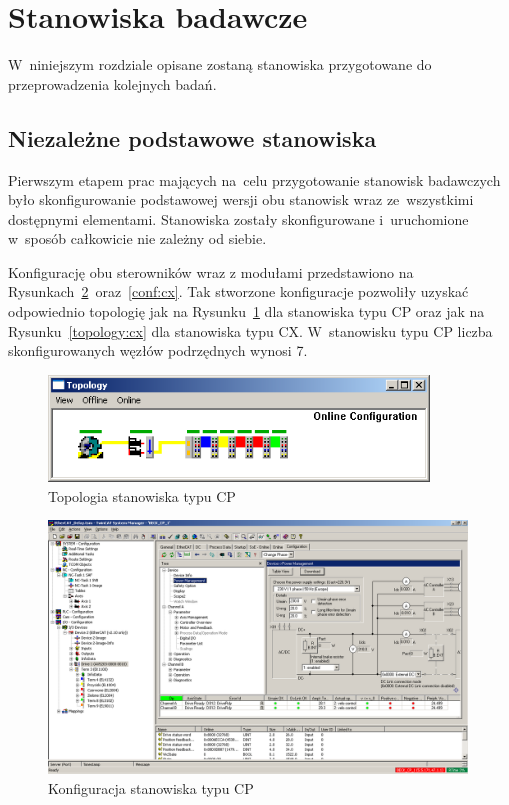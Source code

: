 \section{Stanowiska badawcze}
W~niniejszym rozdziale opisane zostaną stanowiska przygotowane do przeprowadzenia kolejnych badań.

\subsection{Niezależne podstawowe stanowiska}
Pierwszym etapem prac mających na~celu przygotowanie stanowisk badawczych było skonfigurowanie podstawowej wersji obu stanowisk wraz ze~wszystkimi dostępnymi elementami. Stanowiska zostały skonfigurowane i~uruchomione w~sposób całkowicie nie zależny od siebie.

Konfigurację obu sterowników wraz z modułami przedstawiono na Rysunkach~\ref{conf:cp}~oraz~\ref{conf:cx}. Tak stworzone konfiguracje pozwoliły uzyskać odpowiednio topologię jak na Rysunku~\ref{topology:cp} dla stanowiska typu CP oraz jak na Rysunku~\ref{topology:cx} dla stanowiska typu CX. W~stanowisku typu CP liczba skonfigurowanych węzłów podrzędnych wynosi 7.
\begin{figure}[!htb] 	\centering 	\includegraphics[width=0.9\textwidth]{images/topologyCP} \caption{Topologia stanowiska typu CP} \label{topology:cp} \end{figure}
\begin{figure}[!htb] 	\centering 	\includegraphics[width=0.99\textwidth]{images/confCP} \caption{Konfiguracja stanowiska typu CP} \label{conf:cp} \end{figure}

